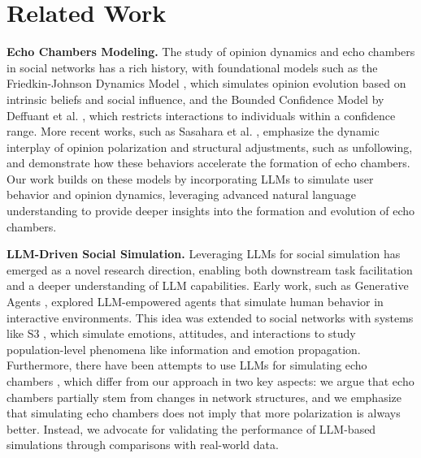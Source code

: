 \section{Related Work}
\textbf{Echo Chambers Modeling.} The study of opinion dynamics and echo chambers in social networks has a rich history, with foundational models such as the Friedkin-Johnson Dynamics Model \cite{friedkin1990social}, which simulates opinion evolution based on intrinsic beliefs and social influence, and the Bounded Confidence Model by Deffuant et al. \cite{deffuant2000mixing}, which restricts interactions to individuals within a confidence range. More recent works, such as Sasahara et al. \cite{sasahara2021social}, emphasize the dynamic interplay of opinion polarization and structural adjustments, such as unfollowing, and demonstrate how these behaviors accelerate the formation of echo chambers. Our work builds on these models by incorporating LLMs to simulate user behavior and opinion dynamics, leveraging advanced natural language understanding to provide deeper insights into the formation and evolution of echo chambers.

\textbf{LLM-Driven Social Simulation.} Leveraging LLMs for social simulation has emerged as a novel research direction, enabling both downstream task facilitation and a deeper understanding of LLM capabilities. Early work, such as Generative Agents \cite{park2023generative}, explored LLM-empowered agents that simulate human behavior in interactive environments. This idea was extended to social networks with systems like S3 \cite{gao2023s}, which simulate emotions, attitudes, and interactions to study population-level phenomena like information and emotion propagation. Furthermore, there have been attempts to use LLMs for simulating echo chambers \cite{wang2024decoding}, which differ from our approach in two key aspects: we argue that echo chambers partially stem from changes in network structures, and we emphasize that simulating echo chambers does not imply that more polarization is always better. Instead, we advocate for validating the performance of LLM-based simulations through comparisons with real-world data. %